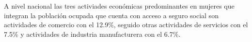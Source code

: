 A nivel nacional las tres activiades económicas predominantes en mujeres que integran la población ocupada que cuenta con acceso a seguro social son actividades de comercio con el 12.9\%, seguido otras actividades de servicios con el 7.5\% y actividades de industria manufacturera con el 6.7\%.